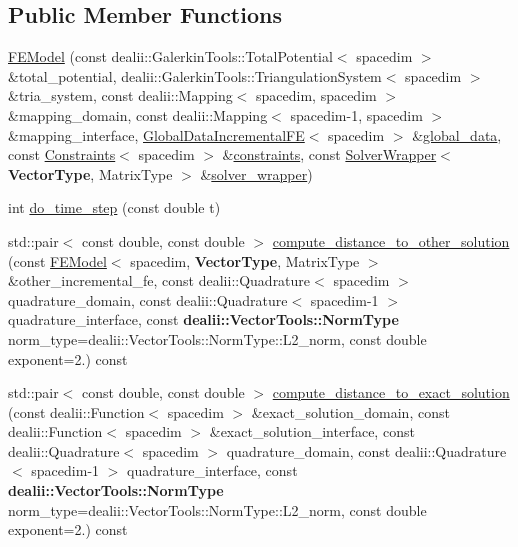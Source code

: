 \subsection*{Public Member Functions}
\begin{DoxyCompactItemize}
\item 
\hyperlink{classincremental_f_e_1_1_f_e_model_a1c4dd1d168c10aed60bfed14fd5f2641}{F\+E\+Model} (const dealii\+::\+Galerkin\+Tools\+::\+Total\+Potential$<$ spacedim $>$ \&total\+\_\+potential, dealii\+::\+Galerkin\+Tools\+::\+Triangulation\+System$<$ spacedim $>$ \&tria\+\_\+system, const dealii\+::\+Mapping$<$ spacedim, spacedim $>$ \&mapping\+\_\+domain, const dealii\+::\+Mapping$<$ spacedim-\/1, spacedim $>$ \&mapping\+\_\+interface, \hyperlink{classincremental_f_e_1_1_global_data_incremental_f_e}{Global\+Data\+Incremental\+FE}$<$ spacedim $>$ \&\hyperlink{classincremental_f_e_1_1_f_e_model_aa0619a9d4856459cfcdaf6fb82995496}{global\+\_\+data}, const \hyperlink{classincremental_f_e_1_1_constraints}{Constraints}$<$ spacedim $>$ \&\hyperlink{classincremental_f_e_1_1_f_e_model_a86375a464ff76f02e74db667f453c6fa}{constraints}, const \hyperlink{classincremental_f_e_1_1_solver_wrapper}{Solver\+Wrapper}$<$ {\bf Vector\+Type}, Matrix\+Type $>$ \&\hyperlink{classincremental_f_e_1_1_f_e_model_a0340e6f1c6949ff2467cd55fb4264575}{solver\+\_\+wrapper})
\item 
int \hyperlink{classincremental_f_e_1_1_f_e_model_a3cf7c696501862875172951b7d73112c}{do\+\_\+time\+\_\+step} (const double t)
\item 
std\+::pair$<$ const double, const double $>$ \hyperlink{classincremental_f_e_1_1_f_e_model_af3e39d66a5bd61d9b6122499cb328bb8}{compute\+\_\+distance\+\_\+to\+\_\+other\+\_\+solution} (const \hyperlink{classincremental_f_e_1_1_f_e_model}{F\+E\+Model}$<$ spacedim, {\bf Vector\+Type}, Matrix\+Type $>$ \&other\+\_\+incremental\+\_\+fe, const dealii\+::\+Quadrature$<$ spacedim $>$ quadrature\+\_\+domain, const dealii\+::\+Quadrature$<$ spacedim-\/1 $>$ quadrature\+\_\+interface, const {\bf dealii\+::\+Vector\+Tools\+::\+Norm\+Type} norm\+\_\+type=dealii\+::\+Vector\+Tools\+::\+Norm\+Type\+::\+L2\+\_\+norm, const double exponent=2.) const 
\item 
std\+::pair$<$ const double, const double $>$ \hyperlink{classincremental_f_e_1_1_f_e_model_aaba79861a19553e350c18c75cc8fd68b}{compute\+\_\+distance\+\_\+to\+\_\+exact\+\_\+solution} (const dealii\+::\+Function$<$ spacedim $>$ \&exact\+\_\+solution\+\_\+domain, const dealii\+::\+Function$<$ spacedim $>$ \&exact\+\_\+solution\+\_\+interface, const dealii\+::\+Quadrature$<$ spacedim $>$ quadrature\+\_\+domain, const dealii\+::\+Quadrature$<$ spacedim-\/1 $>$ quadrature\+\_\+interface, const {\bf dealii\+::\+Vector\+Tools\+::\+Norm\+Type} norm\+\_\+type=dealii\+::\+Vector\+Tools\+::\+Norm\+Type\+::\+L2\+\_\+norm, const double exponent=2.) const 

\end{DoxyCompactItemize}
